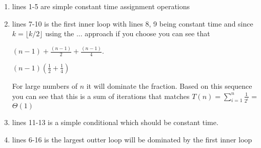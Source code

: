 \documentclass[12pt, letterpaper]{article}
\begin{document}

\begin{enumerate}
    \item lines 1-5 are simple constant time assignment operations
    \item lines 7-10 is the first inner loop with lines 8, 9 being constant time and since
        $k = \lfloor k/2 \rfloor$ using the ... approach if you choose you can see that
        
        $(n - 1) + \frac{(n-1)}{2} + \frac{(n-1)}{4}$.
        
        $(n - 1) ( \frac{1}{2} + \frac{1}{4} )$
        
        For large numbers of $n$ it will dominate the fraction.  Based on this sequence you can see that this 
        is a sum of iterations that matches $T(n) = \sum_{i=1}^{n}{\frac{1}{2^i}}$ = $\Theta(1)$
    \item lines 11-13 is a simple conditional which should be constant time.
    \item lines 6-16 is the largest outter loop will be dominated by the first inner loop
\end{enumerate}
\end{document}
